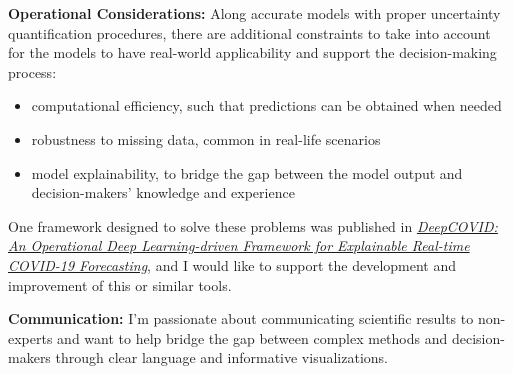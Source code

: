 \documentclass[11pt, a4paper]{awesome-cv}
\begin{document}
\begin{cvletter}
\textbf{Operational Considerations:} Along accurate models with proper uncertainty quantification procedures, there are additional constraints to take into account for the models to have real-world applicability and support the decision-making process:
\begin{itemize}
  \item computational efficiency, such that predictions can be obtained when needed
  \item robustness to missing data, common in real-life scenarios
  \item model explainability, to bridge the gap between the model output and decision-makers' knowledge and experience
\end{itemize}
One framework designed to solve these problems was published in \href{https://ojs.aaai.org/index.php/AAAI/article/view/17808}{\textit{DeepCOVID: An Operational Deep Learning-driven Framework for Explainable Real-time COVID-19 Forecasting}}, and I would like to support the development and improvement of this or similar tools.
  
\textbf{Communication:} I'm passionate about communicating scientific results to non-experts and want to help bridge the gap between complex methods and decision-makers through clear language and informative visualizations.

\end{cvletter}

\makeletterclosing
\end{document}
